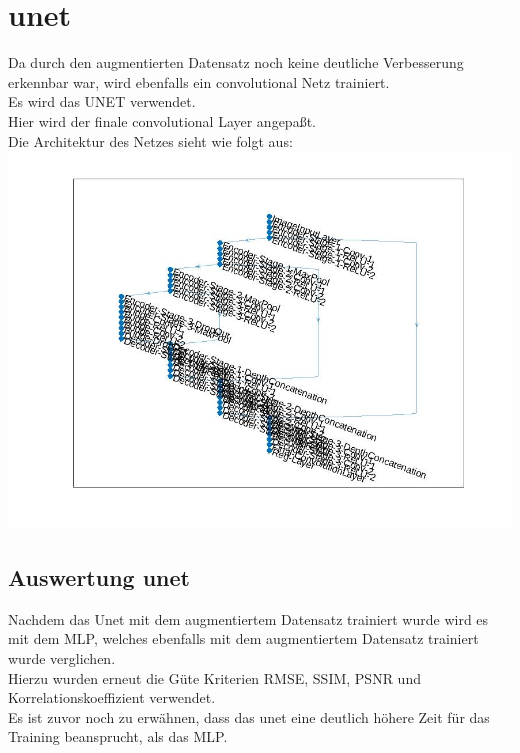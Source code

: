 \documentclass[8pt,a4paper]{article}
\begin{document}
\section{unet}
Da durch den augmentierten Datensatz noch keine deutliche Verbesserung erkennbar war, wird ebenfalls ein convolutional Netz trainiert.\\
Es wird das UNET verwendet.\\
Hier wird der finale convolutional Layer angepaßt.\\
Die Architektur des Netzes sieht wie folgt aus:\\
\includegraphics[scale=0.3]{unetlayers.jpg}
\subsection{Auswertung unet}
Nachdem das Unet mit dem augmentiertem Datensatz trainiert wurde wird es mit dem MLP, welches ebenfalls mit dem augmentiertem Datensatz trainiert wurde verglichen.\\
Hierzu wurden erneut die Güte Kriterien RMSE, SSIM, PSNR und Korrelationskoeffizient verwendet.\\
Es ist zuvor noch zu erwähnen, dass das unet eine deutlich höhere Zeit für das Training beansprucht, als das MLP.\\
\end{document}
